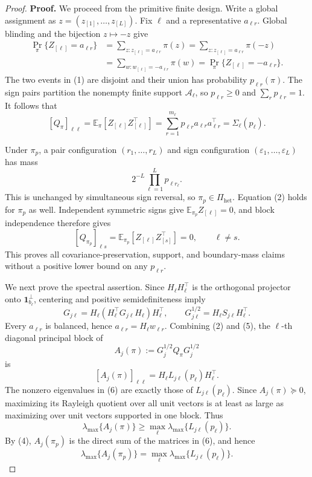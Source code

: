 \documentclass{article}
\begin{document}
\begin{proof}
\textbf{Proof.}
We proceed from the primitive finite design.  Write a global assignment as \(z=(z_{[1]},\ldots,z_{[L]})\).  Fix \(\ell\) and a representative \(a_{\ell r}\).  Global blinding and the bijection \(z\mapsto-z\) give
\[
\begin{aligned}
\Pr_\pi\{Z_{[\ell]}=a_{\ell r}\}
&=\sum_{z:z_{[\ell]}=a_{\ell r}}\pi(z)
=\sum_{z:z_{[\ell]}=a_{\ell r}}\pi(-z)\\
&=\sum_{w:w_{[\ell]}=-a_{\ell r}}\pi(w)
=\Pr_\pi\{Z_{[\ell]}=-a_{\ell r}\}.
\end{aligned}
\tag{1}
\]
The two events in (1) are disjoint and their union has probability \(p_{\ell r}(\pi)\).  The sign pairs partition the nonempty finite support \(\mathcal A_\ell\), so \(p_{\ell r}\ge0\) and \(\sum_rp_{\ell r}=1\).  It follows that
\[
[Q_\pi]_{\ell\ell}
=\mathbb E_\pi[Z_{[\ell]}Z_{[\ell]}^\top]
=\sum_{r=1}^{m_\ell}p_{\ell r}a_{\ell r}a_{\ell r}^\top
=\Sigma_\ell(p_\ell).
\tag{2}
\]

Under \(\pi_p\), a pair configuration \((r_1,\ldots,r_L)\) and sign configuration \((\varepsilon_1,\ldots,\varepsilon_L)\) has mass
\[
2^{-L}\prod_{\ell=1}^Lp_{\ell r_\ell}.
\tag{3}
\]
This is unchanged by simultaneous sign reversal, so \(\pi_p\in\Pi_{\mathrm{het}}\).  Equation (2) holds for \(\pi_p\) as well.  Independent symmetric signs give \(\mathbb E_{\pi_p}Z_{[\ell]}=0\), and block independence therefore gives
\[
[Q_{\pi_p}]_{\ell s}
=\mathbb E_{\pi_p}[Z_{[\ell]}Z_{[s]}^\top]=0,
\qquad \ell\ne s.
\tag{4}
\]
This proves all covariance-preservation, support, and boundary-mass claims without a positive lower bound on any \(p_{\ell r}\).

We next prove the spectral assertion.  Since \(H_\ell H_\ell^\top\) is the orthogonal projector onto \(\mathbf1_{b_\ell}^\perp\), centering and positive semidefiniteness imply
\[
G_{j\ell}=H_\ell(H_\ell^\top G_{j\ell}H_\ell)H_\ell^\top,
\qquad
G_{j\ell}^{1/2}=H_\ell S_{j\ell}H_\ell^\top.
\tag{5}
\]
Every \(a_{\ell r}\) is balanced, hence \(a_{\ell r}=H_\ell w_{\ell r}\).  Combining (2) and (5), the \(\ell\)-th diagonal principal block of
\[
A_j(\pi):=G_j^{1/2}Q_\pi G_j^{1/2}
\]
is
\[
[A_j(\pi)]_{\ell\ell}
=H_\ell L_{j\ell}(p_\ell)H_\ell^\top.
\tag{6}
\]
The nonzero eigenvalues in (6) are exactly those of \(L_{j\ell}(p_\ell)\).  Since \(A_j(\pi)\succeq0\), maximizing its Rayleigh quotient over all unit vectors is at least as large as maximizing over unit vectors supported in one block.  Thus
\[
\lambda_{\max}\{A_j(\pi)\}
\ge\max_\ell\lambda_{\max}\{L_{j\ell}(p_\ell)\}.
\tag{7}
\]
By (4), \(A_j(\pi_p)\) is the direct sum of the matrices in (6), and hence
\[
\lambda_{\max}\{A_j(\pi_p)\}
=\max_\ell\lambda_{\max}\{L_{j\ell}(p_\ell)\}.
\tag{8}
\]


\end{proof}
\end{document}

